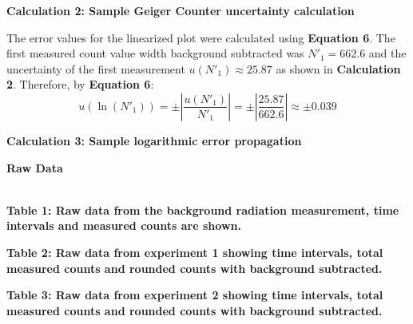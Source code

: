 \documentclass[
	letterpaper, %
	10pt, %
]{CSUniSchoolLabReport}
\begin{document}
\begin{center}
	\textbf{Calculation 2: Sample Geiger Counter uncertainty calculation}
\end{center}
\vspace{10pt}
The error values for the linearized plot were calculated using \textbf{Equation 6}. The first measured count value width background subtracted was $N'_{1} = 662.6$ and the uncertainty of the first measurement $u(N'_1) \approx 25.87$ as shown in \textbf{Calculation 2}. Therefore, by \textbf{Equation 6}:
$$u(\ln(N'_1))= \pm\left|\frac{u(N'_1)}{N'_1}\right|= \pm\left|\frac{25.87}{662.6}\right| \approx \pm0.039$$
\begin{center}
	\textbf{Calculation 3: Sample logarithmic error propagation}
\end{center}
\newpage
{\Large\textbf{Raw Data}}\\
\vspace{20pt}\\
\begin{center}

\end{center}
\begin{center}
	\textbf{Table 1: Raw data from the background radiation measurement, time intervals and measured counts are shown.}
\end{center}

\begin{center}
	\textbf{Table 2: Raw data from experiment 1 showing time intervals, total measured counts and rounded counts with background subtracted.}
\end{center}

\begin{center}
	\textbf{Table 3: Raw data from experiment 2 showing time intervals, total measured counts and rounded counts with background subtracted.}
\end{center}
\end{document}
